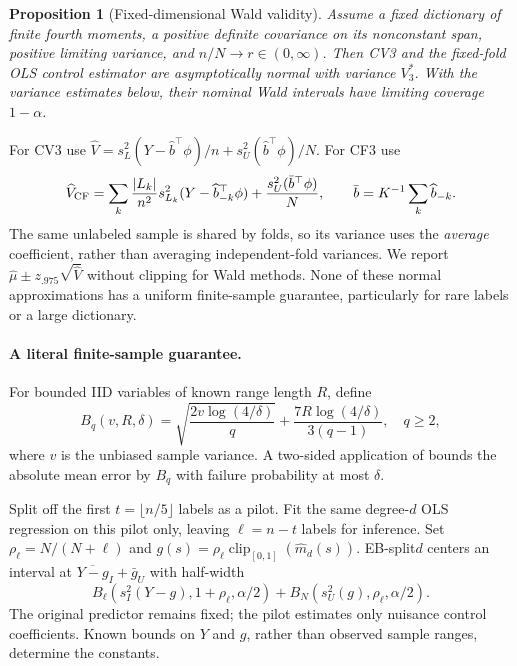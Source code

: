 \documentclass{article}
\newtheorem{proposition}{Proposition}
\begin{document}
\begin{proposition}[Fixed-dimensional Wald validity]
\label{prop:wald}
Assume a fixed dictionary of finite fourth moments, a positive definite covariance on its nonconstant span, positive limiting variance, and $n/N\to r\in(0,\infty)$. Then CV3 and the fixed-fold OLS control estimator are asymptotically normal with variance $V_3^*$. With the variance estimates below, their nominal Wald intervals have limiting coverage $1-\alpha$.
\end{proposition}
For CV3 use $\widehat V=s_L^2(Y-\widehat b^\top\phi)/n+s_U^2(\widehat b^\top\phi)/N$. For CF3 use
\begin{equation}
 \widehat V_{\rm CF}=\sum_k\frac{|L_k|}{n^2}
 s_{L_k}^2(Y-\widehat b_{-k}^\top\phi)
 +\frac{s_U^2(\bar b^\top\phi)}{N},\qquad \bar b=K^{-1}\sum_k\widehat b_{-k}.
 \label{eq:cfvar}
\end{equation}
The same unlabeled sample is shared by folds, so its variance uses the \emph{average} coefficient, rather than averaging independent-fold variances. We report $\widehat\mu\pm z_{.975}\sqrt{\widehat V}$ without clipping for Wald methods. None of these normal approximations has a uniform finite-sample guarantee, particularly for rare labels or a large dictionary.

\paragraph{A literal finite-sample guarantee.}
For bounded IID variables of known range length $R$, define
\begin{equation}
 B_q(v,R,\delta)=\sqrt{\frac{2v\log(4/\delta)}{q}}
       +\frac{7R\log(4/\delta)}{3(q-1)},\quad q\ge2,
 \label{eq:eb}
\end{equation}
where $v$ is the unbiased sample variance. A two-sided application of \citet[Theorem~4]{bernstein} bounds the absolute mean error by $B_q$ with failure probability at most $\delta$.

Split off the first $t=\lfloor n/5\rfloor$ labels as a pilot. Fit the same degree-$d$ OLS regression on this pilot only, leaving $\ell=n-t$ labels for inference. Set $\rho_\ell=N/(N+\ell)$ and $g(s)=\rho_\ell\operatorname{clip}_{[0,1]}(\widehat m_d(s))$. EB-split$d$ centers an interval at $\overline{Y-g}_I+\bar g_U$ with half-width
\begin{equation}
 B_\ell(s_I^2(Y-g),1+\rho_\ell,\alpha/2)
 +B_N(s_U^2(g),\rho_\ell,\alpha/2).
 \label{eq:split}
\end{equation}
The original predictor remains fixed; the pilot estimates only nuisance control coefficients. Known bounds on $Y$ and $g$, rather than observed sample ranges, determine the constants.
\end{document}
